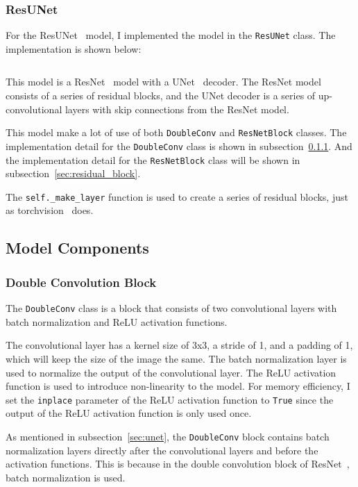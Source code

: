 \subsubsection{ResUNet}

For the ResUNet~\cite{ResUNet} model, I implemented the model in the \texttt{ResUNet} class. The implementation is shown below:

\inputminted[firstline=23]{python}{../src/models/resnet34_unet.py}

This model is a ResNet~\cite{ResNet} model with a UNet~\cite{UNet} decoder.
The ResNet model consists of a series of residual blocks, and the UNet decoder is a series of up-convolutional layers with skip connections from the ResNet model.

This model make a lot of use of both \texttt{DoubleConv} and \texttt{ResNetBlock} classes.
The implementation detail for the \texttt{DoubleConv} class is shown in subsection~\ref{sec:double_conv}.
And the implementation detail for the \texttt{ResNetBlock} class will be shown in subsection~\ref{sec:residual_block}.

The \texttt{self.\_make\_layer} function is used to create a series of residual blocks, just as torchvision~\cite{torchvision2016} does.

\subsection{Model Components}

\subsubsection{Double Convolution Block}
\label{sec:double_conv}

The \texttt{DoubleConv} class is a block that consists of two convolutional layers with batch normalization and ReLU activation functions.

The convolutional layer has a kernel size of 3x3, a stride of 1, and a padding of 1, which will keep the size of the image the same.
The batch normalization layer is used to normalize the output of the convolutional layer.
The ReLU activation function is used to introduce non-linearity to the model.
For memory efficiency, I set the \texttt{inplace} parameter of the ReLU activation function to \texttt{True} since the output of the ReLU activation function is only used once.

As mentioned in subsection~\ref{sec:unet}, the \texttt{DoubleConv} block contains batch normalization layers directly after the convolutional layers and before the activation functions.
This is because in the double convolution block of ResNet~\cite{ResNet}, batch normalization is used.

